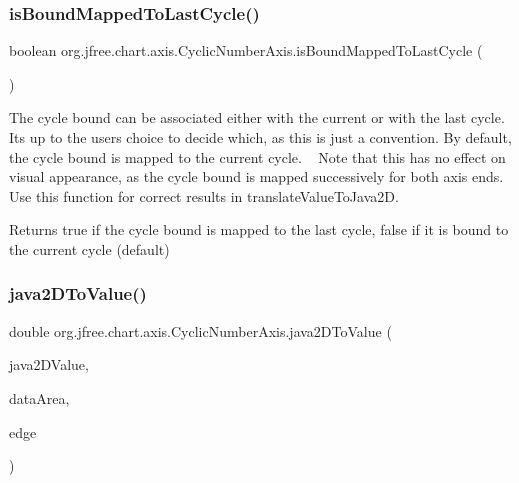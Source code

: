 \subsubsection{\texorpdfstring{is\+Bound\+Mapped\+To\+Last\+Cycle()}{isBoundMappedToLastCycle()}}
{\footnotesize\ttfamily boolean org.\+jfree.\+chart.\+axis.\+Cyclic\+Number\+Axis.\+is\+Bound\+Mapped\+To\+Last\+Cycle (\begin{DoxyParamCaption}{ }\end{DoxyParamCaption})}

The cycle bound can be associated either with the current or with the last cycle. It\textquotesingle{}s up to the user\textquotesingle{}s choice to decide which, as this is just a convention. By default, the cycle bound is mapped to the current cycle. ~\newline
 Note that this has no effect on visual appearance, as the cycle bound is mapped successively for both axis ends. Use this function for correct results in translate\+Value\+To\+Java2D.

\begin{DoxyReturn}{Returns}
{\ttfamily true} if the cycle bound is mapped to the last cycle, {\ttfamily false} if it is bound to the current cycle (default) 
\end{DoxyReturn}
\mbox{\label{classorg_1_1jfree_1_1chart_1_1axis_1_1_cyclic_number_axis_abd6834899322f1d8cbfdaed7aa194e38}} 
\subsubsection{\texorpdfstring{java2\+D\+To\+Value()}{java2DToValue()}}
{\footnotesize\ttfamily double org.\+jfree.\+chart.\+axis.\+Cyclic\+Number\+Axis.\+java2\+D\+To\+Value (\begin{DoxyParamCaption}\item[{double}]{java2\+D\+Value,  }\item[{Rectangle2D}]{data\+Area,  }\item[{Rectangle\+Edge}]{edge }\end{DoxyParamCaption})}

